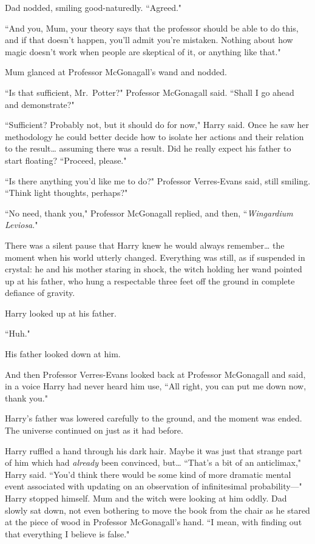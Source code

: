 Dad nodded, smiling good-naturedly. ``Agreed."

``And you, Mum, your theory says that the professor should be able to do this, and if that doesn't happen, you'll admit you're mistaken. Nothing about how magic doesn't work when people are skeptical of it, or anything like that."

Mum glanced at Professor McGonagall's wand and nodded.

``Is that sufficient, Mr.~Potter?" Professor McGonagall said. ``Shall I go ahead and demonstrate?"

``Sufficient? Probably not, but it should do for now," Harry said. Once he saw her methodology he could better decide how to isolate her actions and their relation to the result{\ldots} assuming there was a result. Did he really expect his father to start floating? ``Proceed, please."

``Is there anything you'd like me to do?" Professor Verres-Evans said, still smiling. ``Think light thoughts, perhaps?"

``No need, thank you," Professor McGonagall replied, and then, ``\emph{Wingardium Leviosa}."

There was a silent pause that Harry knew he would always remember{\ldots} the moment when his world utterly changed. Everything was still, as if suspended in crystal: he and his mother staring in shock, the witch holding her wand pointed up at his father, who hung a respectable three feet off the ground in complete defiance of gravity.

Harry looked up at his father.

``Huh."

His father looked down at him.

And then Professor Verres-Evans looked back at Professor McGonagall and said, in a voice Harry had never heard him use, ``All right, you can put me down now, thank you."

Harry's father was lowered carefully to the ground, and the moment was ended. The universe continued on just as it had before.

Harry ruffled a hand through his dark hair. Maybe it was just that strange part of him which had \emph{already} been convinced, but{\ldots} ``That's a bit of an anticlimax," Harry said. ``You'd think there would be some kind of more dramatic mental event associated with updating on an observation of infinitesimal probability---" Harry stopped himself. Mum and the witch were looking at him oddly. Dad slowly sat down, not even bothering to move the book from the chair as he stared at the piece of wood in Professor McGonagall's hand. ``I mean, with finding out that everything I believe is false."


